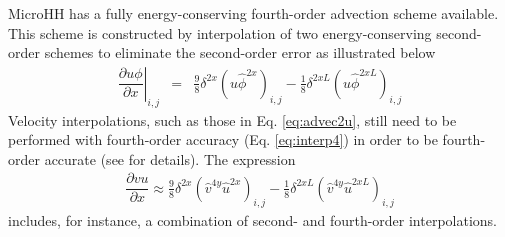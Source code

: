 \documentclass[gmd]{copernicus}
\begin{document}
MicroHH has a fully energy-conserving fourth-order advection scheme \citep{Morinishi1998} available. This scheme is constructed by interpolation of two energy-conserving second-order schemes to eliminate the second-order error as illustrated below
\begin{eqnarray}
\left. \dfrac{\partial u \phi}{\partial x} \right|_{i,j} & = & \frac{9}{8} \delta^{2x} \left( u \widehat{\phi}^{2x} \right)_{i,j} 
                                                             - \frac{1}{8} \delta^{2xL} \left( u \widehat{\phi}^{2xL} \right)_{i,j}%
\end{eqnarray}
Velocity interpolations, such as those in Eq. \ref{eq:advec2u}, still need to be performed with fourth-order accuracy (Eq. \ref{eq:interp4}) in order to  be fourth-order accurate (see \citet{Morinishi1998} for details). The expression
\begin{eqnarray}
\dfrac{\partial v u}{\partial x} \approx \frac{9}{8} \delta^{2x} \left( \widehat{v}^{4y} \widehat{u}^{2x} \right)_{i,j} 
                                       - \frac{1}{8} \delta^{2xL} \left( \widehat{v}^{4y} \widehat{u}^{2xL} \right)_{i,j}
\end{eqnarray}
includes, for instance, a combination of second- and fourth-order interpolations.
\end{document}
